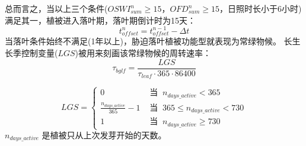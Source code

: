 总而言之，当以上三个条件($OSWI_{sum}^n\geqslant 15$，$OFD_{sum}^n\geqslant 15$，日照时长小于6小时)满足其一，植被进入落叶期，落叶期倒计时为15天：
\begin{equation}
t_{offset}^{n}=t_{offset}^{n-1}-\Delta t
\end{equation}
当落叶条件始终不满足(1年以上)，胁迫落叶植被功能型就表现为常绿物候。
长生长季控制变量($LGS$)被用来刻画该常绿物候的周转速率：
\begin{equation}
\tau_{b g l f}=\frac{L G S}{\tau_{leaf} \cdot 365 \cdot 86400}
\end{equation}

\begin{equation}
L G S=\begin{cases}
0 &  \text{ 当 }\ n_{ {days}\_{active}}<365 \\ 
\frac{n_{ {days\_{active}}}}{365}-1 &  \text{ 当 }\ 365 \leqslant n_{ {days }\_{active} }<730 \\ 
1 & \text{ 当 }\ n_{ {days}\_{active}} \geqslant 730
\end{cases}
\end{equation}
$n_{days\_{active}}$ 是植被只从上次发芽开始的天数。



